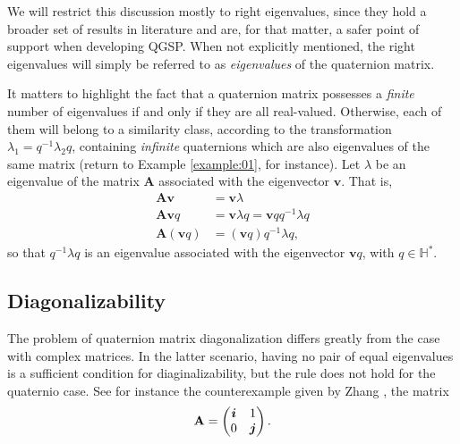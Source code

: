 We will restrict this discussion mostly to right eigenvalues, since they hold a broader set of results in literature \cite[Cap. 5]{zhang1997quaternions} and are, for that matter, a safer point of support when developing QGSP. When not explicitly mentioned, the right eigenvalues will simply be referred to as \textit{eigenvalues} of the quaternion matrix.

It matters to highlight the fact that a quaternion matrix possesses a \textit{finite} number of eigenvalues if and only if they are all real-valued. Otherwise, each of them will belong to a similarity class, according to the transformation $ \lambda_1 = q^{-1} \lambda_2 q $, containing \textit{infinite} quaternions which are also eigenvalues of the same matrix (return to Example \ref{example:01}, for instance). Let $ \lambda $ be an eigenvalue of the matrix $ \mathbf{A} $ associated with the eigenvector $ \mathbf{v} $. That is,
\begin{equation}
\begin{aligned}
\label{eq:similar}
\mathbf{A} \mathbf{v} &= \mathbf{v} \lambda \\
\mathbf{A} \mathbf{v} q &= \mathbf{v} \lambda q = \mathbf{v} q q^{-1} \lambda q \\
\mathbf{A} (\mathbf{v} q) &= (\mathbf{v} q) q^{-1} \lambda q,
\end{aligned}
\end{equation}
so that $ q^{-1} \lambda q $ is an eigenvalue associated with the eigenvector $ \mathbf{v}q $, with $ q \in \mathbb{H}^\ast $.

\subsection{Diagonalizability}
\label{subsec:autovetores_XA}

The problem of quaternion matrix diagonalization differs greatly from the case with complex matrices. In the latter scenario, having no pair of equal eigenvalues is a sufficient condition for diaginalizability, but the rule does not hold for the quaternio case. See for instance the counterexample given by Zhang \cite[Exemplo 7.4]{zhang1997quaternions}, the matrix
\begin{equation}
\mathbf{A} =
\begin{pmatrix}
\boldsymbol{i} & 1\\ 
0 & \boldsymbol{j}
\end{pmatrix}.
\end{equation}

